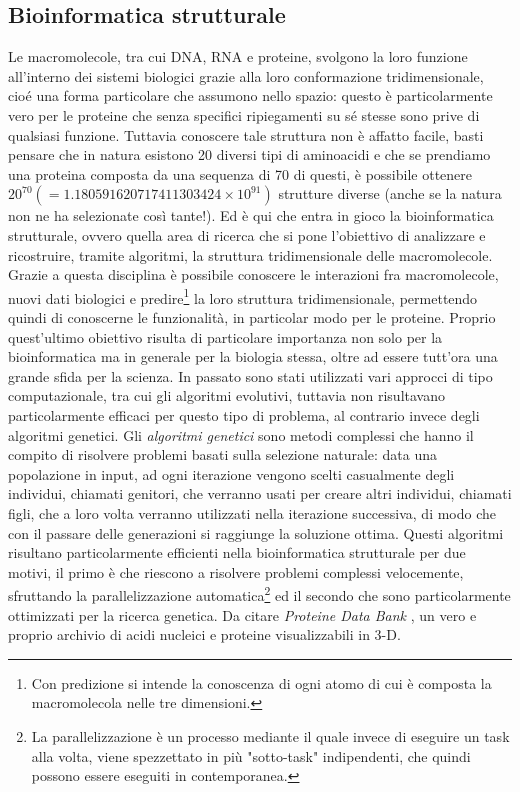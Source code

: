 \subsection{Bioinformatica strutturale}
Le macromolecole, tra cui DNA, RNA e proteine, svolgono la loro funzione all'interno dei sistemi biologici grazie alla loro conformazione tridimensionale, cioé una forma particolare che assumono nello spazio: questo è particolarmente vero per le proteine che senza specifici ripiegamenti su sé stesse sono prive di qualsiasi funzione. Tuttavia conoscere tale struttura non è affatto facile, basti pensare che in natura esistono 20 diversi tipi di aminoacidi e che se prendiamo una proteina composta da una sequenza di 70 di questi, è possibile ottenere $20^{70}(=1.180591620717411303424\times{10^{91}})$ strutture diverse (anche se la natura non ne ha selezionate  così tante!). Ed è qui che entra in gioco la bioinformatica strutturale, ovvero quella area di ricerca che si pone l'obiettivo di analizzare e ricostruire, tramite algoritmi, la struttura tridimensionale delle macromolecole.
\newline
Grazie a questa disciplina è possibile conoscere le interazioni fra macromolecole, nuovi dati biologici e predire\footnote{Con predizione si intende la conoscenza di ogni atomo di cui è composta la macromolecola nelle tre dimensioni.} la loro struttura tridimensionale, permettendo quindi di conoscerne le funzionalità, in particolar modo per le proteine. Proprio quest'ultimo obiettivo risulta di particolare importanza non solo per la bioinformatica ma in generale per la biologia stessa, oltre ad essere tutt'ora una grande sfida per la scienza.
\newline
In passato sono stati utilizzati vari approcci di tipo computazionale, tra cui gli algoritmi evolutivi, tuttavia non risultavano particolarmente efficaci per questo tipo di problema, al contrario invece degli algoritmi genetici.
\newline
Gli \textit{algoritmi genetici} sono metodi complessi che hanno il compito di risolvere problemi basati sulla selezione naturale: data una popolazione in input, ad ogni iterazione vengono scelti casualmente degli individui, chiamati genitori, che verranno usati per creare altri individui, chiamati figli, che a loro volta verranno utilizzati nella iterazione successiva, di modo che con il passare delle generazioni si raggiunge la soluzione ottima.
\newline
Questi algoritmi risultano particolarmente efficienti nella bioinformatica strutturale per due motivi, il primo è che riescono a risolvere problemi complessi velocemente, sfruttando la parallelizzazione automatica\footnote{La parallelizzazione è un processo mediante il quale invece di eseguire un task alla volta, viene spezzettato in più "sotto-task" indipendenti, che quindi possono essere eseguiti in contemporanea.} ed il secondo che sono particolarmente ottimizzati per la ricerca genetica.
\newline
Da citare \textit{Proteine Data Bank} \cite{proteineDataBank}, un vero e proprio archivio di acidi nucleici e proteine visualizzabili in 3-D.

